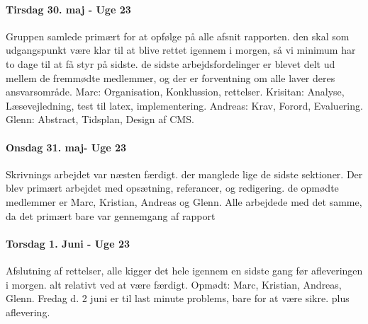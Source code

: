 \paragraph{Tirsdag 30. maj - Uge 23}
Gruppen samlede primært for at opfølge på alle afsnit rapporten. den skal som udgangspunkt være klar til at blive rettet igennem i morgen, så vi minimum har to dage til at få styr på sidste. de sidste arbejdsfordelinger er blevet delt ud mellem de fremmødte medlemmer, og der er forventning om alle laver deres ansvarsområde.
Marc: Organisation, Konklussion, rettelser.
Krisitan: Analyse, Læsevejledning, test til latex, implementering.
Andreas: Krav, Forord, Evaluering.
Glenn: Abstract, Tidsplan, Design af CMS.

\paragraph{Onsdag 31. maj- Uge 23}
Skrivnings arbejdet var næsten færdigt. der manglede lige de sidste sektioner. Der blev primært arbejdet med opsætning, referancer, og redigering. de opmødte medlemmer er Marc, Kristian, Andreas og Glenn.
Alle arbejdede med det samme, da det primært bare var gennemgang af rapport

\paragraph{Torsdag 1. Juni - Uge 23}
Afslutning af rettelser, alle kigger det hele igennem en sidste gang før afleveringen i morgen. alt relativt ved at være færdigt.
Opmødt: Marc, Kristian, Andreas, Glenn.
Fredag d. 2 juni er til last minute problems, bare for at være sikre. plus aflevering.